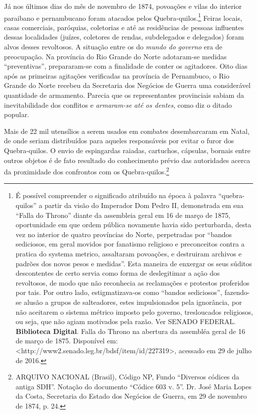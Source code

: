 \begin{refsection}
Já nos últimos dias do mês de novembro de 1874, povoações e vilas do interior paraibano e pernambucano foram atacados pelos Quebra-quilos.\footnote{É possível compreender o significado atribuído na época à palavra “quebra-quilos” a partir da visão do Imperador Dom Pedro II, demonstrada em sua “Falla do Throno” diante da assembleia geral em 16 de março de 1875, oportunidade em que ordem pública novamente havia sido perturbarda, desta vez no interior de quatro províncias do Norte, perpetradas por “bandos sediciosos, em geral movidos por fanatismo religioso e preconceitos contra a pratica do systema metrico, assaltaram povoações, e destruiram archivos e padrões dos novos pesos e medidas”. Esta maneira de enxergar os seus súditos descontentes de certo servia como forma de deslegitimar a ação dos revoltosos, de modo que não reconhecia as reclamações e protestos proferidos por tais. Por outro lado, estigmatizava-os como “bandos sediciosos”, fazendo-se alusão a grupos de salteadores, estes impulsionados pela ignorância, por não aceitarem o sistema métrico imposto pelo governo, tresloucados religiosos, ou seja, que não agiam motivados pela razão. Ver SENADO FEDERAL. \textbf{Biblioteca Digital}. Falla do Throno na abertura da assembléa geral de 16 de março de 1875. Disponível em: <http://www2.senado.leg.br/bdsf/item/id/227319>, acessado em 29 de julho de 2016.} Feiras locais, casas comerciais, paróquias, coletorias e até as residências de pessoas influentes dessas localidades (juízes, coletores de rendas, subdelegados e delegados) foram alvos desses revoltosos. A situação entre os do \textit{mundo do governo} era de preocupação. Na província do Rio Grande do Norte adotaram-se medidas “preventivas”, prepararam-se com a finalidade de conter os agitadores. Oito dias após as primeiras agitações verificadas na província de Pernambuco, o Rio Grande do Norte recebeu da Secretaria dos Negócios de Guerra uma considerável quantidade de armamento. Parecia que os representantes provinciais sabiam da inevitabilidade dos conflitos e \textit{armaram-se até os dentes}, como diz o ditado popular. 

Mais de 22 mil utensílios a serem usados em combates desembarcaram em Natal, de onde seriam distribuídos para aqueles responsáveis por evitar o furor dos Quebra-quilos. O envio de espingardas raiadas, cartuchos, cápsulas, bornais entre outros objetos é de fato resultado do conhecimento prévio das autoridades acerca da proximidade dos confrontos com os Quebra-quilos.\footnote{ARQUIVO NACIONAL (Brasil), Código NP, Fundo ``Diversos códices da antiga SDH''. Notação do documento “Códice 603 v. 5”. Dr. José Maria Lopes da Costa, Secretaria do Estado dos Negócios de Guerra, em 29 de novembro de 1874, p. 24.}


\end{refsection}
